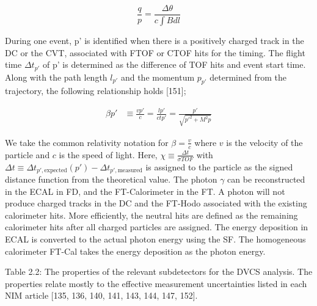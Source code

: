 \begin{equation}
    \frac{q}{p} = \frac{\Delta \theta}{c \int B dl}
\end{equation}

During one event, p' is identified when there is a positively charged track in the DC
or the CVT, associated with FTOF or CTOF hits for the timing. The flight time $\Delta t_{p'}$ of p' is determined as the difference of TOF hits and event start time. Along
with the path length $l_{p'}$ and the momentum $p_{p'}$ determined from the trajectory, the following relationship holds [151];

\begin{align*}
    \beta p' &\equiv \frac{v p'}{c} = \frac{l p'}{c t p'} = \frac{p'}{\sqrt{p'^2 + M^2 p}}
\end{align*}

We take the common relativity notation for $\beta = \frac{v}{c}$ where $v$ is the velocity of the particle and $c$ is the speed of light. Here, $\chi \equiv \frac{\Delta t}{\sigma TOF}$ with $\Delta t \equiv \Delta t_{p', \text{expected}}(p') - \Delta t_{p', \text{measured}}$ is assigned to the particle as the signed distance function from the theoretical value. The photon $\gamma$ can be reconstructed in the ECAL in FD, and the FT-Calorimeter in the FT. A photon will not produce charged tracks in the DC and the FT-Hodo associated with the existing calorimeter hits. More efficiently, the neutral hits are defined as the remaining calorimeter hits after all charged particles are assigned. The energy deposition in ECAL is converted to the actual photon energy using the SF. The homogeneous calorimeter FT-Cal takes the energy deposition as the photon energy.

Table 2.2: The properties of the relevant subdetectors for the DVCS analysis. The
properties relate mostly to the effective measurement uncertainties listed in each NIM
article [135, 136, 140, 141, 143, 144, 147, 152].

